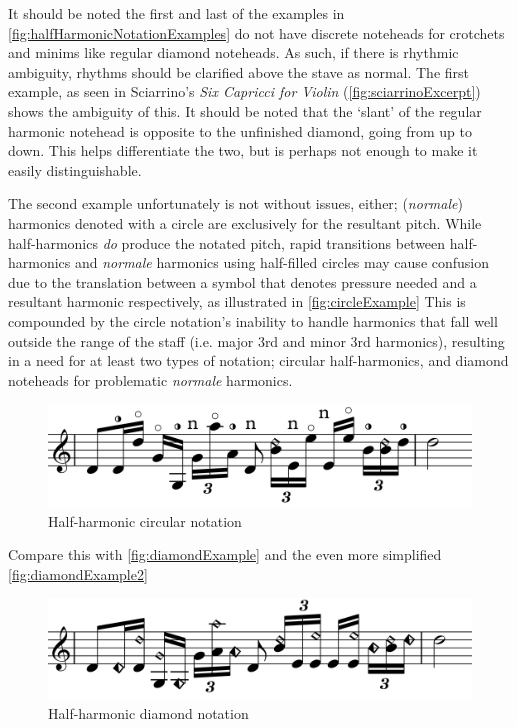 It should be noted the first and last of the examples in \autoref{fig:halfHarmonicNotationExamples} do not have discrete noteheads for crotchets and minims like regular diamond noteheads.
As such, if there is rhythmic ambiguity, rhythms should be clarified above the stave as normal.
The first example, as seen in Sciarrino's \emph{Six Capricci for Violin} (\autoref{fig:sciarrinoExcerpt}) shows the ambiguity of this.
It should be noted that the `slant' of the regular harmonic notehead is opposite to the unfinished diamond, going from up to down.
This helps differentiate the two, but is perhaps not enough to make it easily distinguishable.

The second example unfortunately is not without issues, either; (\emph{normale}) harmonics denoted with a circle are exclusively for the resultant pitch.\autocite[419]{gouldBars2011} 
While half-harmonics \emph{do} produce the notated pitch, rapid transitions between half-harmonics and \emph{normale} harmonics using half-filled circles may cause confusion due to the translation between a symbol that denotes pressure needed and a resultant harmonic respectively, as illustrated in \autoref{fig:circleExample}
This is compounded by the circle notation's inability to handle harmonics that fall well outside the range of the staff (i.e. major 3rd and minor 3rd harmonics), resulting in a need for at least two types of notation; circular half-harmonics, and diamond noteheads for problematic \emph{normale} harmonics.

\begin{figure}
    \includegraphics[width=\linewidth]{./resources/circleExample.pdf}
    \caption{Half-harmonic circular notation} \label{fig:circleExample}
  \end{figure}

Compare this with \autoref{fig:diamondExample} and the even more simplified \autoref{fig:diamondExample2}
  \begin{figure}
    \includegraphics[width=\linewidth]{./resources/diamondExample.pdf}
    \caption{Half-harmonic diamond notation} \label{fig:diamondExample}
  \end{figure}

